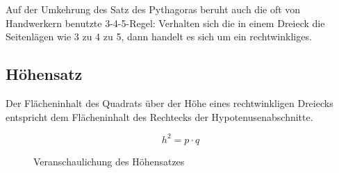 \begin{beme}
 Auf der Umkehrung des Satz des Pythagoras beruht auch die oft von Handwerkern benutzte 3-4-5-Regel: Verhalten sich die in einem Dreieck die Seitenlägen wie 3 zu 4 zu 5, dann handelt es sich um ein rechtwinkliges.
\end{beme}


\subsection{Höhensatz}

\begin{ssatz}[Höhensatz]
   Der Flächeninhalt des Quadrats über der Höhe eines rechtwinkligen Dreiecks entspricht dem Flächeninhalt des Rechtecks der Hypotenusenabschnitte.
    \begin{blockwhitebox}
 \begin{equation*} h^2 = p\cdot q
 \end{equation*}
 \end{blockwhitebox}
 \begin{figure}\begin{center}
               \end{center}
\caption{Veranschaulichung des Höhensatzes}
\end{figure}
\end{ssatz}

